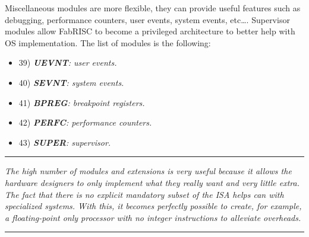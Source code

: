         Miscellaneous modules are more flexible, they can provide useful features such as debugging, performance counters, user events, system events, etc\ldots. Supervisor modules allow FabRISC to become a privileged architecture to better help with OS implementation. The list of modules is the following:

        \begin{itemize}

            \item 39) \textit{\textbf{UEVNT}: user events.}
            \item 40) \textit{\textbf{SEVNT}: system events.}
            \item 41) \textit{\textbf{BPREG}: breakpoint registers.}
            \item 42) \textit{\textbf{PERFC}: performance counters.}
            \item 43) \textit{\textbf{SUPER}: supervisor.}

        \end{itemize}

    \par\noindent\rule{\textwidth}{0.4pt}
    \textit{The high number of modules and extensions is very useful because it allows the hardware designers to only implement what they really want and very little extra. The fact that there is no explicit mandatory subset of the ISA helps can with specialized systems. With this, it becomes perfectly possible to create, for example, a floating-point only processor with no integer instructions to alleviate overheads.}
    \par\noindent\rule{\textwidth}{0.4pt}